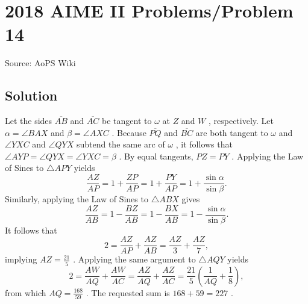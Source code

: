 \documentclass[12pt]{article}
\begin{document}
\section*{{2018 AIME II Problems/Problem 14}}
Source: AoPS Wiki

\subsection*{Solution}
Let the sides $\overline{AB}$ and $\overline{AC}$ be tangent to $\omega$ at $Z$ and $W$ , respectively. Let $\alpha = \angle BAX$ and $\beta = \angle AXC$ . Because $\overline{PQ}$ and $\overline{BC}$ are both tangent to $\omega$ and $\angle YXC$ and $\angle QYX$ subtend the same arc of $\omega$ , it follows that $\angle AYP = \angle QYX = \angle YXC = \beta$ . By equal tangents, $PZ = PY$ . Applying the Law of Sines to $\triangle APY$ yields \[\frac{AZ}{AP} = 1 + \frac{ZP}{AP} = 1 + \frac{PY}{AP} = 1 + \frac{\sin\alpha}{\sin\beta}.\] Similarly, applying the Law of Sines to $\triangle ABX$ gives \[\frac{AZ}{AB} = 1 - \frac{BZ}{AB} = 1 - \frac{BX}{AB} = 1 - \frac{\sin\alpha}{\sin\beta}.\] It follows that \[2 = \frac{AZ}{AP} + \frac{AZ}{AB} = \frac{AZ}3 + \frac{AZ}7,\] implying $AZ = \tfrac{21}5$ . Applying the same argument to $\triangle AQY$ yields \[2 = \frac{AW}{AQ} + \frac{AW}{AC} = \frac{AZ}{AQ} + \frac{AZ}{AC} = \frac{21}5\left(\frac{1}{AQ} + \frac 18\right),\] from which $AQ = \tfrac{168}{59}$ . The requested sum is $168 + 59 = \boxed{227}$ .
\end{document}
